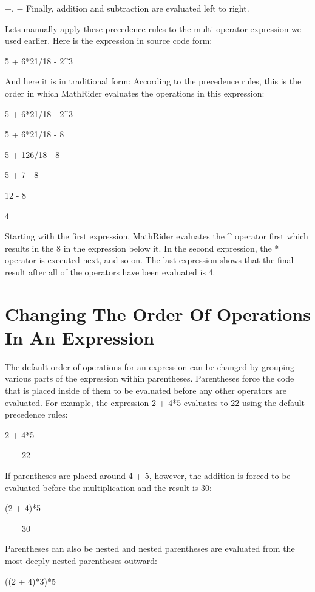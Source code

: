 \documentclass[12pt,oneside]{book}
\begin{document}
+, $-$ Finally, addition and subtraction are evaluated left to right.


Lets manually apply these precedence rules to the multi{}-operator expression we used earlier. Here is the expression in source code form: 

5 + 6*21/18 {}- 2\^{}3


And here it is in traditional form:
According to the precedence rules, this is the order in which MathRider evaluates the operations in this expression: 

5 + 6*21/18 {}- 2\^{}3

5 + 6*21/18 {}- 8

5 + 126/18 {}- 8

5 + 7 {}- 8

12 {}- 8

4


Starting with the first expression, MathRider evaluates the \^{} operator first which results in the 8 in the expression below it. In the second expression, the * operator is executed next, and so on. The last expression shows that the final result after all of the operators have been evaluated is 4.

\section[Changing The Order Of Operations In An Expression]{Changing The Order Of Operations In An Expression}

The default order of operations for an expression can be changed by grouping various parts of the expression within parentheses. Parentheses force the code that is placed inside of them to be evaluated before any other operators are evaluated. For example, the expression 2 + 4*5 evaluates to 22 using the default precedence rules: 

2 + 4*5

{\textbar}

\ \ \ \ 22


If parentheses are placed around 4 + 5, however, the addition is forced to be evaluated before the multiplication and the result is 30: 


(2 + 4)*5

{\textbar}

\ \ \ \ 30


Parentheses can also be nested and nested parentheses are evaluated from the most deeply nested parentheses outward: 

((2 + 4)*3)*5
\end{document}
